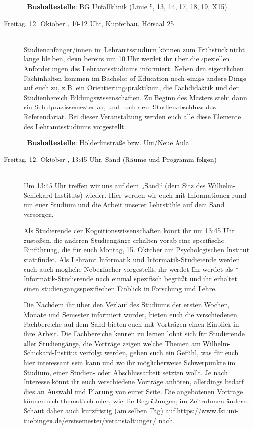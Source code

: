 \begin{description}
~\textbf{Bushaltestelle:} BG Unfallklinik (Linie 5, 13, 14, 17, 18, 19, X15)

\iflehramt
\item[Freitag, 12. Oktober \Jahr, 10-12 Uhr, Kupferbau, Hörsaal 25]\ \\
Studienanfänger/innen im Lehramtsstudium können zum Frühstück nicht lange bleiben, denn bereits um 10 Uhr werdet ihr über die speziellen
Anforderungen des Lehramtsstudiums informiert. Neben den eigentlichen Fachinhalten kommen im
Bachelor of Education noch einige andere Dinge auf euch zu, z.B. ein Orientierungspraktikum, die
Fachdidaktik und der Studienbereich Bildungswissenschaften. Zu Beginn des Masters steht dann
ein Schulpraxissemester an, und nach dem Studienabschluss das Referendariat. Bei dieser Veranstaltung werden euch
alle diese Elemente des Lehramtsstudiums vorgestellt.

~\textbf{Bushaltestelle:} Hölderlinstraße bzw. Uni/Neue Aula
\fi

\item[Freitag, 12. Oktober \Jahr, 13{\ifkogwiss}:45{\fi} Uhr, Sand (Räume und Programm folgen)]\ \\
Um 13{\ifkogwiss}:45{\fi} Uhr treffen wir uns auf dem „Sand“ (dem Sitz des Wilhelm-Schickard-Instituts)
wieder. Hier werden wir euch mit Informationen rund um{\ifkogwiss} {\else} euer Studium und {\fi}die Arbeit unserer Lehrstühle auf dem Sand versorgen.

{\ifkogwiss}Als Studierende der Kognitionswissenschaften könnt ihr um 13:45 Uhr zusto{\ss}en, die anderen Studiengänge erhalten vorab eine spezifische Einführung, die für euch Montag, 15. Oktober am Psychologischen Institut stattfindet. {\else}{\ifinfo}Als Lehramt Informatik und Informatik-Studierende werden euch auch mögliche Nebenfächer vorgestellt, ihr werdet {\else}Ihr werdet als *-Informatik-Studierende {\fi}noch einmal spezifisch begrüßt und ihr erhaltet einen studiengangsspezifischen Einblick in Forschung und Lehre.{\fi}

{\ifkogwiss}Die {\else}Nachdem ihr über den Verlauf des Studiums der ersten Wochen, Monate und Semester informiert wurdet, bieten euch die {\fi}verschiedenen Fachbereiche {\ifkogwiss}auf dem Sand bieten euch {\else} {\fi}mit Vorträgen einen Einblick in ihre Arbeit. Die Fachbereiche kennen zu lernen lohnt sich für Studierende aller Studiengänge, die Vorträge zeigen welche Themen am Wilhelm-Schickard-Institut verfolgt werden, geben euch ein Gefühl, was für euch hier interessant sein kann und wo ihr möglicherweise Schwerpunkte im Studium, einer Studien- oder Abschlussarbeit setzten wollt. Je nach Interesse könnt ihr euch verschiedene Vorträge anhören, allerdings bedarf dies an Auswahl und Planung von eurer Seite. Die angebotenen Vorträge können sich thematisch oder, wie die Begrüßungen, im Zeitrahmen ändern. Schaut daher auch kurzfristig (am selben Tag) auf \url{https://www.fsi.uni-tuebingen.de/erstsemester/veranstaltungen/} nach.


\end{description}
